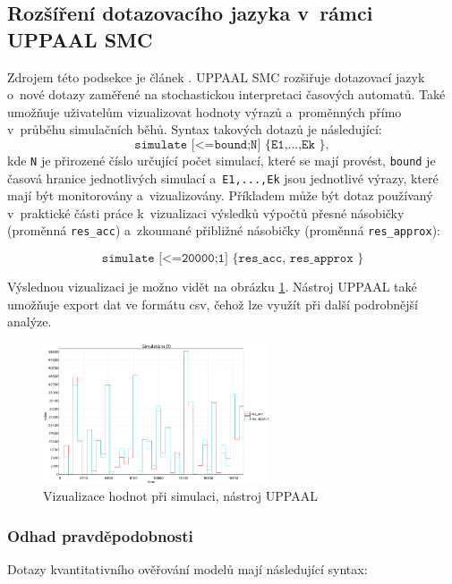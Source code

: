 \subsection{Rozšíření dotazovacího jazyka v~rámci UPPAAL SMC} \label{uppaal_smc_queries}
Zdrojem této podsekce je článek \cite{uppaal_smc}. UPPAAL SMC rozšiřuje dotazovací jazyk o~nové dotazy zaměřené na stochastickou interpretaci časových automatů. Také umožňuje uživatelům vizualizovat hodnoty výrazů a~proměnných přímo v~průběhu simulačních běhů. Syntax takových dotazů je následující:
\begin{equation*}
    \texttt{simulate [<=bound;N] \{ E1,...,Ek \}},
\end{equation*}
kde \texttt{N} je přirozené číslo určující počet simulací, které se mají provést, \texttt{bound} je časová hranice jednotlivých simulací a~\texttt{E1,...,Ek} jsou jednotlivé výrazy, které mají být monitorovány a~vizualizovány. Příkladem může být dotaz používaný v~praktické části práce k~vizualizaci výsledků výpočtů přesné násobičky (proměnná \texttt{res\_acc}) a~zkoumané přibližné násobičky (proměnná \texttt{res\_approx}):

\begin{equation*}
    \texttt{simulate [<=20000;1] \{ res\_acc, res\_approx \}}
\end{equation*}

Výslednou vizualizaci je možno vidět na obrázku \ref{fig:simulate_example}. Nástroj UPPAAL také umožňuje export dat ve formátu csv, čehož lze využít při další podrobnější analýze.

\begin{figure}[H]
    \centering
    \includegraphics[width=0.6\textwidth]{obrazky-figures/simulate_example.png}
    \caption{Vizualizace hodnot při simulaci, nástroj UPPAAL}
    \label{fig:simulate_example}
\end{figure}

\subsubsection{Odhad pravděpodobnosti}
Dotazy kvantitativního ověřování modelů mají následující syntax:

